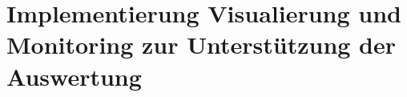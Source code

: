%   
   
  


\section{Implementierung Visualierung und Monitoring zur Unterst\"utzung der Auswertung}